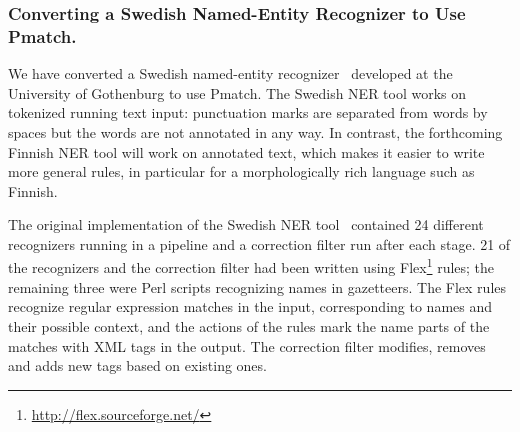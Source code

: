 \documentclass{llncs}
\begin{document}

\subsubsection{Converting a Swedish Named-Entity Recognizer to Use
  Pmatch.}

We have converted a Swedish named-entity recognizer~\cite{kokkinakis/2003}
developed at the University of Gothenburg to use Pmatch.
The Swedish NER tool works on tokenized running text
input: punctuation marks are separated from words by spaces but the
words are not annotated in any way. In contrast, the forthcoming
Finnish NER tool will work on annotated text, which makes it easier to
write more general rules, in particular for a morphologically rich
language such as Finnish.

The original implementation of the Swedish NER tool~\cite{kokkinakis/2003}
contained 24 different recognizers running in a
pipeline and a correction filter run after each stage. 21 of the
recognizers and the correction filter had been written using
Flex\footnote{\url{http://flex.sourceforge.net/}} rules; the remaining three
were Perl scripts recognizing names in gazetteers. The Flex rules
recognize regular expression matches in the input, corresponding to names
and their possible context, and the actions of the rules mark the name
parts of the matches with XML tags in the output. The correction
filter modifies, removes and adds new tags based on existing ones.

\end{document}
